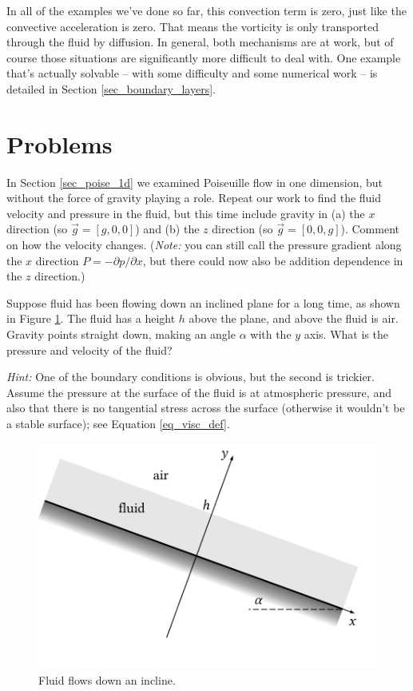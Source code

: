 In all of the examples we've done so far, this convection term is zero, just like the convective acceleration is zero.  That means the vorticity is only transported through the fluid by diffusion.  In general, both mechanisms are at work, but of course those situations are significantly more difficult to deal with.  One example that's actually solvable -- with some difficulty and some numerical work -- is detailed in Section \ref{sec_boundary_layers}.



\section*{Problems}
%


\begin{problem}
\label{prob_poise_grav}
In Section \ref{sec_poise_1d} we examined Poiseuille flow in one dimension, but without the force of gravity playing a role.  Repeat our work to find the fluid velocity and pressure in the fluid, but this time include gravity in (a) the $x$ direction (so $\vec{g} = [g,0,0]$) and (b) the $z$ direction (so $\vec{g} = [0, 0, g]$).  Comment on how the velocity changes.  (\emph{Note:} you can still call the pressure gradient along the $x$ direction $P = -\partial p / \partial x$, but there could now also be addition dependence in the $z$ direction.)
\end{problem}

\begin{problem}
Suppose fluid has been flowing down an inclined plane for a long time, as shown in Figure \ref{fig_incline_setup}.  The fluid has a height $h$ above the plane, and above the fluid is air.  Gravity points straight down, making an angle $\alpha$ with the $y$ axis.  What is the pressure and velocity of the fluid?  

\emph{Hint:} One of the boundary conditions is obvious, but the second is trickier.  Assume the pressure at the surface of the fluid is at atmospheric pressure, and also that there is no tangential stress across the surface (otherwise it wouldn't be a stable surface); see Equation \ref{eq_visc_def}.
\end{problem}

\begin{figure}
\centering
\includegraphics[width=0.7\linewidth]{Figures/Chapter2/fig_incline_setup}
\caption{Fluid flows down an incline.}
\label{fig_incline_setup}
\end{figure}

